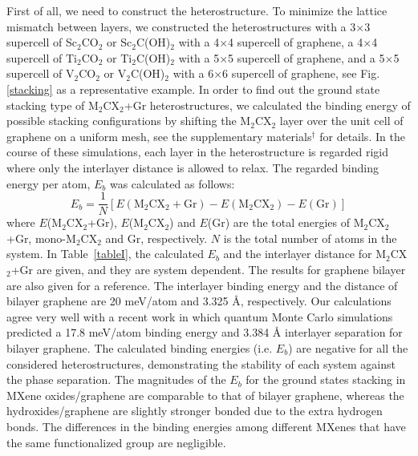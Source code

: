 First of all, we need to construct the heterostructure. To minimize the lattice mismatch between layers, we constructed the heterostructures with a 3$\times$3 supercell of Sc$_2$CO$_2$ or Sc$_2$C(OH)$_2$ with a 4$\times$4 supercell of graphene, a  4$\times$4 supercell of Ti$_2$CO$_2$ or Ti$_2$C(OH)$_2$ with a 5$\times$5 supercell of graphene, and a 5$\times$5 supercell of V$_2$CO$_2$ or V$_2$C(OH)$_2$ with a 6$\times$6 supercell of graphene, see Fig. \ref{stacking} as a representative example. In order to find out the ground state stacking type of M$_2$CX$_2$+Gr heterostructures, we calculated the binding energy of possible stacking configurations by shifting the M$_2$CX$_2$ layer over the unit cell of graphene on a uniform mesh, see the supplementary materials$^\dag$ for details. In the course of these simulations, each layer in the heterostructure is regarded rigid where only the interlayer distance is allowed to relax. The regarded binding energy per atom, $E_b$ was calculated as follows:
\begin{equation}
E_b=\frac{1}{N}[E(\mathrm{M}_2\mathrm{C}\mathrm{X}_2+\mathrm{Gr})-E(\mathrm{M}_2\mathrm{C}\mathrm{X}_2)-E(\mathrm{Gr})]
\end{equation}
where $E$(M$_2$CX$_2$+Gr), $E$(M$_2$CX$_2$) and $E$(Gr) are the total energies of M$_2$CX$_2$+Gr, mono-M$_2$CX$_2$ and Gr, respectively. $N$ is the total number of atoms in the system. In Table~\ref{tableI}, the calculated $E_b$ and the interlayer distance for M$_2$CX$_2$+Gr are given, and they are system dependent. The results for graphene bilayer are also given for a reference. The interlayer binding energy and the distance of bilayer graphene are 20 meV/atom and 3.325 {\AA}, respectively. Our calculations agree very well with a recent work in which quantum Monte Carlo simulations predicted a 17.8 meV/atom binding energy and 3.384 {\AA} interlayer separation for bilayer graphene\cite{PhysRevLett.115.115501}.  The calculated binding energies (i.e. $E_b$) are negative for all the considered heterostructures, demonstrating the stability of each system against the phase separation. The magnitudes of the $E_b$ for the ground states stacking in MXene oxides/graphene are comparable to that of bilayer graphene, whereas the hydroxides/graphene are slightly stronger bonded due to the extra hydrogen bonds. The differences in the binding energies among different MXenes that have the same functionalized group are negligible. 

